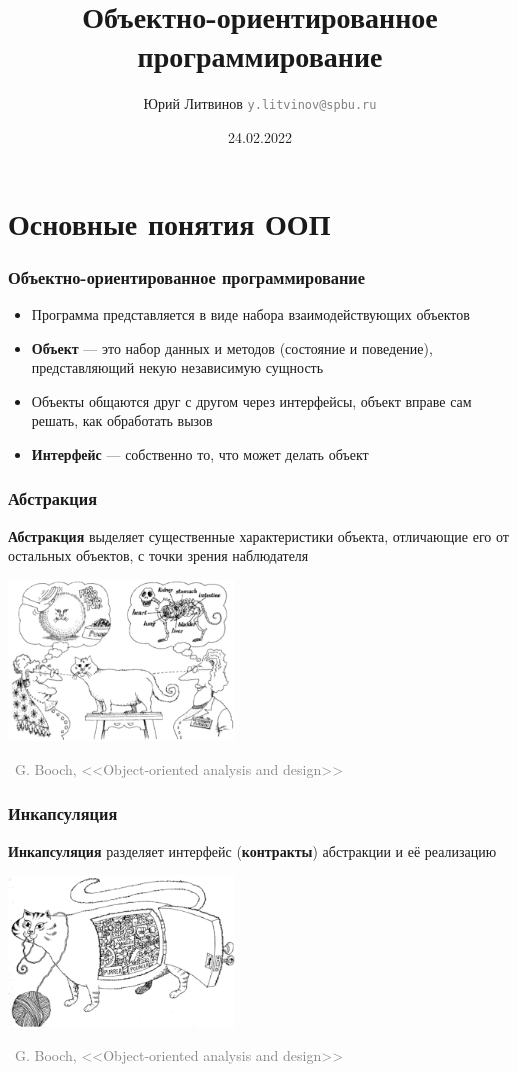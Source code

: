 \documentclass[xetex,mathserif,serif]{beamer}
\title{Объектно-ориентированное программирование}
\author[Юрий Литвинов]{Юрий Литвинов \newline \textcolor{gray}{\small\texttt{y.litvinov@spbu.ru}}}
\date{24.02.2022}
\newcommand{\attribution}[1] {
    \begin{flushright}\begin{scriptsize}\textcolor{gray}{\textcopyright\, #1}\end{scriptsize}\end{flushright}
}
\begin{document}
    
    \frame{\titlepage}

    \section{Основные понятия ООП}

    \begin{frame}
        \frametitle{Объектно-ориентированное программирование}
        \begin{itemize}
            \item Программа представляется в виде набора взаимодействующих объектов
            \item \textbf{Объект} --- это набор данных и методов (состояние и поведение), представляющий некую независимую сущность
            \item Объекты общаются друг с другом через интерфейсы, объект вправе сам решать, как обработать вызов
            \item \textbf{Интерфейс} --- собственно то, что может делать объект
        \end{itemize}
    \end{frame}

    \begin{frame}
        \frametitle{Абстракция}
        \textbf{Абстракция} выделяет существенные характеристики объекта, отличающие его от остальных объектов, с точки зрения наблюдателя
        \vskip 1cm
        \begin{center}
            \includegraphics[width=0.45\textwidth]{abstraction.png}
        \end{center}
        \attribution{G. Booch, <<Object-oriented analysis and design>>}
    \end{frame}

    \begin{frame}
        \frametitle{Инкапсуляция}
        \textbf{Инкапсуляция} разделяет интерфейс (\textbf{контракты}) абстракции и её реализацию

        \vskip 1cm
        \begin{center}
            \includegraphics[width=0.45\textwidth]{incapsulation.png}
        \end{center}
        \attribution{G. Booch, <<Object-oriented analysis and design>>}
    \end{frame}
\end{document}
